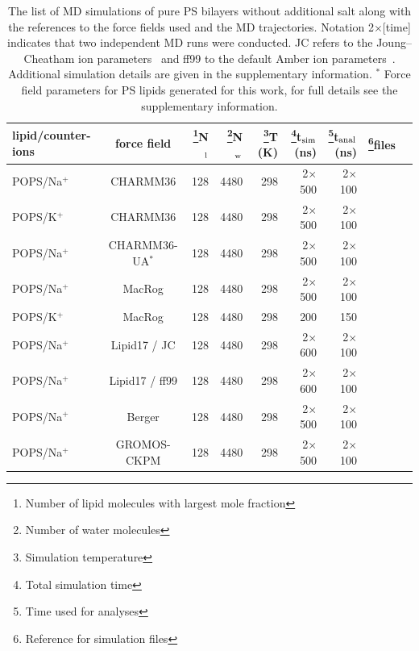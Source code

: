 \documentclass[aps,prl,superscriptaddress,twocolumn]{revtex4}
\begin{document}
\begin{table}[htb]
\centering
\caption{The list of MD simulations of pure PS bilayers without additional salt along with the references to the force fields used and the MD trajectories.
  Notation 2$\times$[time] indicates that two independent MD runs were conducted.
  JC refers to the Joung--Cheatham ion parameters~\cite{joung08} and ff99 to the default Amber ion parameters~\cite{aqvist90}.
  Additional simulation details are given in the supplementary information.
  $^*$ Force field parameters for PS lipids generated for this work, for full details see the supplementary information.
}\label{PSsystems}
\begin{tabular}{lcrrrrrcc}
lipid/counter-ions  & force field & \footnote{Number of lipid molecules with largest mole fraction}N$_{{\rm l}}$  & \footnote{Number of water molecules}N$_{{\rm w}}$  & \footnote{Simulation temperature}T (K)  & \footnote{Total simulation time}t$_{{\rm sim}}$(ns)  & \footnote{Time used for analyses}t$_{{\rm anal}}$ (ns)  & \footnote{Reference for simulation files}files & \tabularnewline
\hline 
POPS/Na$^{+}$  & CHARMM36 \cite{venable13}  & 128  & 4480  & 298  & 2$\times$500  & 2$\times$100  & \cite{charmm36POPS298K}  & \tabularnewline
POPS/K$^{+}$  & CHARMM36 \cite{venable13}  & 128  & 4480  & 298  & 2$\times$500  & 2$\times$100  & \cite{charmm36POPS298Kpotassium}  & \tabularnewline
POPS/Na$^{+}$  & CHARMM36-UA$^*$ \cite{venable13,lee14} & 128  & 4480  & 298  & 2$\times$500  & 2$\times$100  & \cite{charmm36uaPOPS298K}  & \tabularnewline
POPS/Na$^{+}$  & MacRog \cite{maciejewski14}  & 128  & 4480  & 298  & 2$\times$500  & 2$\times$100  & \cite{macrogPOPS298Kcorrect}  & \tabularnewline
POPS/K$^{+}$  & MacRog \cite{maciejewski14}  & 128  & 4480  & 298  & 200  & 150  & \cite{macrogPOPS298KwithK}  & \tabularnewline
POPS/Na$^{+}$  & Lipid17 \cite{gould18} / JC \cite{joung08}  & 128  & 4480  & 298  & 2$\times$600  & 2$\times$100  & \cite{lipid17POPSjcions}  & \tabularnewline
POPS/Na$^{+}$  & Lipid17 \cite{gould18} / ff99 \cite{aqvist90}  & 128  & 4480  & 298  & 2$\times$600  & 2$\times$100  & \cite{lipid17POPSff99ions}  & \tabularnewline
POPS/Na$^{+}$  & Berger \cite{mukhopadhyay04}  & 128  & 4480  & 298  & 2$\times$500  & 2$\times$100  & \cite{bergerPOPS298K}  & \tabularnewline
POPS/Na$^{+}$  & GROMOS-CKPM \cite{Chandrasekhar03,kukol09,piggot12} & 128  & 4480  & 298  & 2$\times$500  & 2$\times$100  & \cite{ckp1POPS303K}  & \tabularnewline

\end{tabular}
\end{table}
\end{document}

